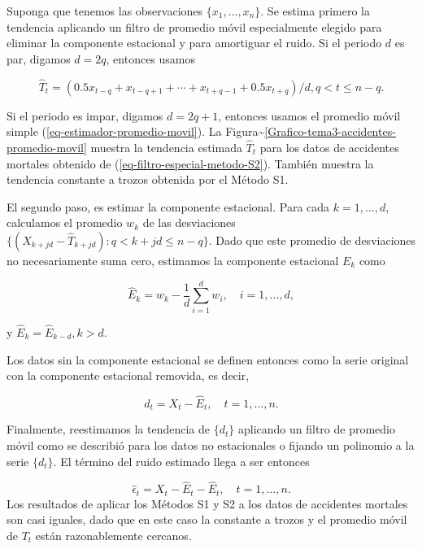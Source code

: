 \documentclass[12pt,]{krantz}
\theoremstyle{definition}
\theoremstyle{definition}
\theoremstyle{definition}
\theoremstyle{remark}
\begin{document}
Suponga que tenemos las observaciones \(\{x_1,\ldots,x_n\}\). Se estima
primero la tendencia aplicando un filtro de promedio móvil especialmente
elegido para eliminar la componente estacional y para amortiguar el
ruido. Si el periodo \(d\) es par, digamos \(d=2q\), entonces usamos

\begin{equation}
\hat{T}_t = (0.5x_{t-q} + x_{t-q+1} + \cdots + x_{t+q-1} + 0.5x_{t+q})/d, q<t\leq n-q.
\label{eq:eq-filtro-especial-metodo-S2}
\end{equation}

Si el periodo es impar, digamos \(d=2q+1\), entonces usamos el promedio
móvil simple (\ref{eq-estimador-promedio-movil}). La
Figura\textasciitilde{}\ref{Grafico-tema3-accidentes-promedio-movil}
muestra la tendencia estimada \(\hat{T}_t\) para los datos de accidentes
mortales obtenido de (\ref{eq-filtro-especial-metodo-S2}). También
muestra la tendencia constante a trozos obtenida por el Método S1.

El segundo paso, es estimar la componente estacional. Para cada
\(k=1,\ldots,d\), calculamos el promedio \(w_k\) de las desviaciones
\(\{(X_{k+jd}-\hat{T}_{k+jd}):q<k+jd\leq n-q\}\). Dado que este promedio
de desviaciones no necesariamente suma cero, estimamos la componente
estacional \(E_k\) como

\begin{equation}
\hat{E}_k = w_k -\frac{1}{d}\sum_{i=1}^dw_i,\quad i=1,\ldots,d,
\label{eq:eq-estimador-Et-metodo-S2}
\end{equation}

y \(\hat{E}_k=\hat{E}_{k-d},k>d\).

Los datos sin la componente estacional se definen entonces como la serie
original con la componente estacional removida, es decir,

\begin{equation}
d_t = X_t-\hat{E}_t,\quad t=1,\ldots,n.
\label{eq:eq-serie-destacionalizada}
\end{equation}

Finalmente, reestimamos la tendencia de \(\{d_t\}\) aplicando un filtro
de promedio móvil como se describió para los datos no estacionales o
fijando un polinomio a la serie \(\{d_t\}\). El término del ruido
estimado llega a ser entonces

\[\hat{\epsilon}_t = X_t - \hat{E}_t - \hat{E}_t, \quad t=1,\ldots,n.\]
Los resultados de aplicar los Métodos S1 y S2 a los datos de accidentes
mortales son casi iguales, dado que en este caso la constante a trozos y
el promedio móvil de \(T_t\) están razonablemente cercanos.
\end{document}

